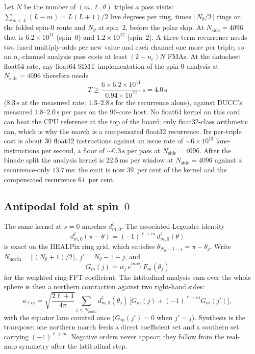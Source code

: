 \documentclass[usenatbib,useAMS]{mnras}
\begin{document}
Let $N$ be the number of $(m,\ell,\theta)$ triples a pass visits: $\sum_{m<L}(L-m)=L(L+1)/2$ live degrees per ring, times $\lceil N_\theta/2\rceil$ rings on the folded spin-$0$ route and $N_\theta$ at spin~$2$, before the polar skip. At $N_{\mathrm{side}}=4096$ that is $6.2\times10^{11}$ (spin~$0$) and $1.2\times10^{12}$ (spin~$2$). A three-term recurrence needs two fused multiply-adds per new value and each channel one more per triple, so an $n_c$-channel analysis pass costs at least $(2+n_c)N$ FMAs. At the datasheet float64 rate, any float64 SIMT implementation of the spin-$0$ analysis at $N_{\mathrm{side}}=4096$ therefore needs
\begin{equation}
\label{eq:wall}
T\ge\frac{6\times6.2\times10^{11}}{0.94\times10^{12}}\,\mathrm{s}=4.0\,\mathrm{s}
\end{equation}
($8.3\,\mathrm{s}$ at the measured rate; $1.3$--$2.8\,\mathrm{s}$ for the recurrence alone), against DUCC's measured $1.8$--$2.0\,\mathrm{s}$ per pass on the 96-core host. No float64 kernel on this card can beat the CPU reference at the top of the board; only float32-class arithmetic can, which is why the march is a compensated float32 recurrence. Its per-triple cost is about $30$ float32 instructions against an issue rate of $\sim6\times10^{13}$ lane-instructions per second, a floor of $\sim0.3\,\mathrm{s}$ per pass at $N_{\mathrm{side}}=4096$. After the binade split the analysis kernel is $22.5\,\mathrm{ms}$ per window at $N_{\mathrm{side}}=4096$ against a recurrence-only $13.7\,\mathrm{ms}$: the emit is now $39$~per cent of the kernel and the compensated recurrence $61$~per cent.

\subsection{Antipodal fold at spin~$0$}
\label{sec:fold}

The same kernel at $s=0$ marches $d^\ell_{m,0}$. The associated-Legendre identity
\begin{equation}
  d^\ell_{m,0}(\pi-\theta)=(-1)^{\ell+m}\,d^\ell_{m,0}(\theta)
\end{equation}
is exact on the HEALPix ring grid, which satisfies $\theta_{N_\theta-1-j}=\pi-\theta_j$. Write $N_{\mathrm{north}}=\lfloor(N_\theta+1)/2\rfloor$, $j'=N_\theta-1-j$, and
\begin{equation}
  G_m(j)=w_j\,e^{im\phi_j}\,F_m(\theta_j)
\end{equation}
for the weighted ring-FFT coefficient. The latitudinal analysis sum over the whole sphere is then a northern contraction against two right-hand sides:
\begin{equation}
\label{eq:fold}
  a_{\ell m}
  =\sqrt{\frac{2\ell+1}{4\pi}}
  \sum_{j<N_{\mathrm{north}}}
  d^\ell_{m,0}(\theta_j)\,
  \bigl[G_m(j)+(-1)^{\ell+m}G_m(j')\bigr],
\end{equation}
with the equator lane counted once ($G_m(j')=0$ when $j'=j$). Synthesis is the transpose: one northern march feeds a direct coefficient set and a southern set carrying $(-1)^{\ell+m}$. Negative orders never appear; they follow from the real-map symmetry after the latitudinal step.
\end{document}
